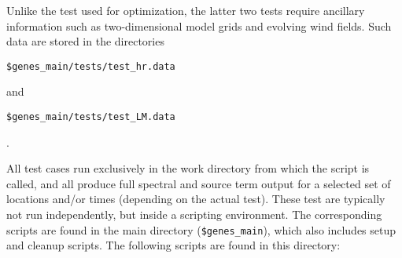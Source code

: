 \documentclass[12pt]{article}
\newcommand{\code}{\tt}
\begin{document}
\noindent
Unlike the test used for optimization, the latter two tests require ancillary
information such as two-dimensional model grids and evolving wind fields. Such
data are stored in the directories \\
\centerline{\code \$genes\_main/tests/test\_hr.data}
\noindent and \\
\centerline{\code \$genes\_main/tests/test\_LM.data}.

\vspace{\baselineskip}
\noindent
All test cases run exclusively in the work directory from which the script is
called, and all produce full spectral and source term output for a selected
set of locations and/or times (depending on the actual test). These test are
typically not run independently, but inside a scripting environment. The
corresponding scripts are found in the main directory ({\code \$genes\_main}),
which also includes setup and cleanup scripts. The following scripts are found
in this directory:
\end{document}
